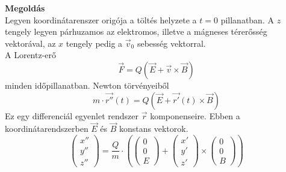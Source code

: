 \documentclass[11pt,a4paper,openany,leqno]{article}
\begin{document}
\textbf{Megoldás}\\
\indent
Legyen koordinátarenszer origója a töltés helyzete a $t=0$ pillanatban. A $z$ tengely legyen párhuzamos az elektromos, illetve a mágneses térerősség vektorával, az $x$ tengely pedig a $\vec{v}_0$ sebesség vektorral.\\ \indent
A Lorentz-erő
$$ \vec{F} = Q(\vec{E} + \vec{v} \times \vec{B}) $$
\indent{}
minden időpillanatban. Newton törvényeiből
$$ m \cdot\vec{r''}(t) = Q(\vec{E} + \vec{r'}(t) \times \vec{B}) $$
\indent
Ez egy differenciál egyenlet rendszer $\vec{r}$ komponenseire. Ebben a koordinátarendszerben $\vec{E}$ és $\vec{B}$ konstans vektorok.\\ \indent
$$ \begin{pmatrix} x'' \\ y'' \\ z''  \end{pmatrix} = \frac{Q}{m} \cdot (\begin{pmatrix} 0 \\ 0 \\ E  \end{pmatrix} + \begin{pmatrix} x' \\ y' \\ z'  \end{pmatrix} \times \begin{pmatrix} 0 \\ 0 \\ B  \end{pmatrix}) $$
\end{document}
